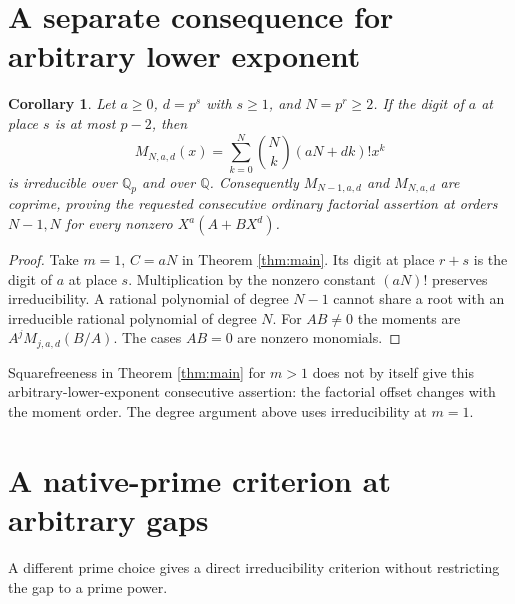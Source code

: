 \documentclass[11pt]{article}
\newtheorem{corollary}[theorem]{Corollary}
\begin{document}
\section{A separate consequence for arbitrary lower exponent}
\begin{corollary}\label{cor:generala}
Let $a\ge0$, $d=p^s$ with $s\ge1$, and $N=p^r\ge2$.
If the digit of $a$ at place $s$ is at most $p-2$, then
\[
 M_{N,a,d}(x)=\sum_{k=0}^N\binom Nk(aN+dk)!x^k
\]
is irreducible over $\mathbb Q_p$ and over $\mathbb Q$.
Consequently $M_{N-1,a,d}$ and $M_{N,a,d}$ are coprime, proving
the requested consecutive ordinary factorial assertion at orders
$N-1,N$ for every nonzero $X^a(A+BX^d)$.
\end{corollary}
\begin{proof}
Take $m=1$, $C=aN$ in Theorem \ref{thm:main}. Its digit at place
$r+s$ is the digit of $a$ at place $s$.
Multiplication by the nonzero constant $(aN)!$ preserves
irreducibility. A rational polynomial of degree $N-1$ cannot share
a root with an irreducible rational polynomial of degree $N$.
For $AB\ne0$ the moments are $A^j M_{j,a,d}(B/A)$.
The cases $AB=0$ are nonzero monomials.
\end{proof}

Squarefreeness in Theorem \ref{thm:main} for $m>1$ does not by itself
give this arbitrary-lower-exponent consecutive assertion: the factorial
offset changes with the moment order. The degree argument above uses
irreducibility at $m=1$.

\section{A native-prime criterion at arbitrary gaps}
A different prime choice gives a direct irreducibility criterion
without restricting the gap to a prime power.
\end{document}
